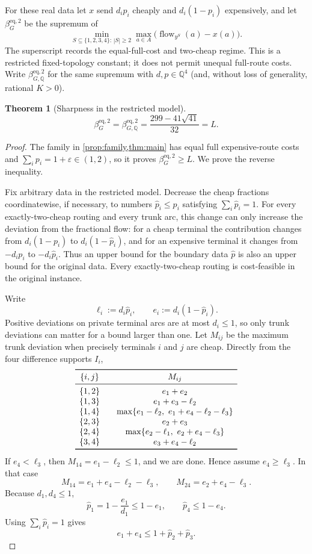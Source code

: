 \documentclass[11pt]{article}
\newtheorem{theorem}{Theorem}
\theoremstyle{remark}
\newcommand{\Q}{\mathbb{Q}}
\newcommand{\flow}{\operatorname{flow}}
\begin{document}
For these real data let $x$ send $d_ip_i$ cheaply and $d_i(1-p_i)$
expensively, and let $\beta_G^{\mathrm{eq},2}$ be the supremum of
\[
 \min_{S\subseteq\{1,2,3,4\}:\,|S|\ge2}
 \max_{a\in A}\bigl(\flow_{y^S}(a)-x(a)\bigr).
\]
The superscript records the equal-full-cost and two-cheap regime.  This is a
restricted fixed-topology constant; it does not permit unequal full-route
costs.  Write $\beta_{G,\Q}^{\mathrm{eq},2}$ for the same supremum with
$d,p\in\Q^4$ (and, without loss of generality, rational $K>0$).

\begin{theorem}[Sharpness in the restricted model]\label{thm:sharp-model}
\[
 \beta_G^{\mathrm{eq},2}
 =\beta_{G,\Q}^{\mathrm{eq},2}
 =\frac{299-41\sqrt{41}}{32}=L.
\]
\end{theorem}
\begin{proof}
The family in \cref{prop:family,thm:main} has equal full expensive-route
costs and $\sum_i p_i=1+\varepsilon\in(1,2)$, so it proves
$\beta_G^{\mathrm{eq},2}\ge L$.  We prove the reverse inequality.

Fix arbitrary data in the restricted model.  Decrease the cheap fractions
coordinatewise, if necessary, to numbers $\widehat p_i\le p_i$ satisfying
$\sum_i\widehat p_i=1$.  For every exactly-two-cheap routing and every trunk
arc, this change can only increase the deviation from the fractional flow:
for a cheap terminal the contribution changes from $d_i(1-p_i)$ to
$d_i(1-\widehat p_i)$, and for an expensive terminal it changes from
$-d_ip_i$ to $-d_i\widehat p_i$.  Thus an upper bound for the boundary data
$\widehat p$ is also an upper bound for the original data.  Every
exactly-two-cheap routing is cost-feasible in the original instance.

Write
\[
 \ell_i:=d_i\widehat p_i,
 \qquad
 e_i:=d_i(1-\widehat p_i).
\]
Positive deviations on private terminal arcs are at most $d_i\le1$, so only
trunk deviations can matter for a bound larger than one.  Let $M_{ij}$ be
the maximum trunk deviation when precisely terminals $i$ and $j$ are cheap.
Directly from the four difference supports $I_i$,
\[
\begin{array}{c@{\qquad}c}
\toprule
\{i,j\}&M_{ij}\\
\midrule
\{1,2\}&e_1+e_2\\
\{1,3\}&e_1+e_3-\ell_2\\
\{1,4\}&\max\{e_1-\ell_2,\ e_1+e_4-\ell_2-\ell_3\}\\
\{2,3\}&e_2+e_3\\
\{2,4\}&\max\{e_2-\ell_1,\ e_2+e_4-\ell_3\}\\
\{3,4\}&e_3+e_4-\ell_2\\
\bottomrule
\end{array}
\]
If $e_4<\ell_3$, then $M_{14}=e_1-\ell_2\le1$, and we are done.  Hence
assume $e_4\ge\ell_3$.  In that case
\[
 M_{14}=e_1+e_4-\ell_2-\ell_3,
 \qquad
 M_{24}=e_2+e_4-\ell_3.
\]
Because $d_1,d_4\le1$,
\[
 \widehat p_1=1-\frac{e_1}{d_1}\le1-e_1,
 \qquad
 \widehat p_4\le1-e_4.
\]
Using $\sum_i\widehat p_i=1$ gives
\begin{equation}\label{eq:e14-bound}
 e_1+e_4\le1+\widehat p_2+\widehat p_3.
\end{equation}


\end{proof}
\end{document}
